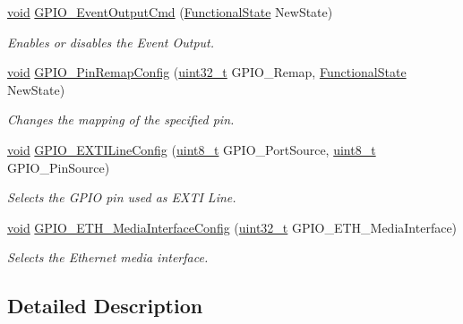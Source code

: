 \begin{DoxyCompactItemize}
\hyperlink{group___n_a_m_e_ga18028b8badbf1ea7e704ccac3c488e82}{void} \hyperlink{group___g_p_i_o___exported___functions_gaf13ab3d59e467df44b492f1cdfe2f588}{G\-P\-I\-O\-\_\-\-Event\-Output\-Cmd} (\hyperlink{group___exported__types_gac9a7e9a35d2513ec15c3b537aaa4fba1}{Functional\-State} New\-State)
\begin{DoxyCompactList}\small\item\em Enables or disables the Event Output. \end{DoxyCompactList}\item 
\hyperlink{group___n_a_m_e_ga18028b8badbf1ea7e704ccac3c488e82}{void} \hyperlink{group___g_p_i_o___exported___functions_ga64eb76f6211b840daf9829289df4208b}{G\-P\-I\-O\-\_\-\-Pin\-Remap\-Config} (\hyperlink{stdint_8h_a435d1572bf3f880d55459d9805097f62}{uint32\-\_\-t} G\-P\-I\-O\-\_\-\-Remap, \hyperlink{group___exported__types_gac9a7e9a35d2513ec15c3b537aaa4fba1}{Functional\-State} New\-State)
\begin{DoxyCompactList}\small\item\em Changes the mapping of the specified pin. \end{DoxyCompactList}\item 
\hyperlink{group___n_a_m_e_ga18028b8badbf1ea7e704ccac3c488e82}{void} \hyperlink{group___g_p_i_o___exported___functions_ga8c1f13646d7418827378032a584da653}{G\-P\-I\-O\-\_\-\-E\-X\-T\-I\-Line\-Config} (\hyperlink{stdint_8h_aba7bc1797add20fe3efdf37ced1182c5}{uint8\-\_\-t} G\-P\-I\-O\-\_\-\-Port\-Source, \hyperlink{stdint_8h_aba7bc1797add20fe3efdf37ced1182c5}{uint8\-\_\-t} G\-P\-I\-O\-\_\-\-Pin\-Source)
\begin{DoxyCompactList}\small\item\em Selects the G\-P\-I\-O pin used as E\-X\-T\-I Line. \end{DoxyCompactList}\item 
\hyperlink{group___n_a_m_e_ga18028b8badbf1ea7e704ccac3c488e82}{void} \hyperlink{group___g_p_i_o___exported___functions_gacbfad958f684347be0f2c762dc85c3c2}{G\-P\-I\-O\-\_\-\-E\-T\-H\-\_\-\-Media\-Interface\-Config} (\hyperlink{stdint_8h_a435d1572bf3f880d55459d9805097f62}{uint32\-\_\-t} G\-P\-I\-O\-\_\-\-E\-T\-H\-\_\-\-Media\-Interface)
\begin{DoxyCompactList}\small\item\em Selects the Ethernet media interface. \end{DoxyCompactList}\end{DoxyCompactItemize}


\subsection{Detailed Description}


